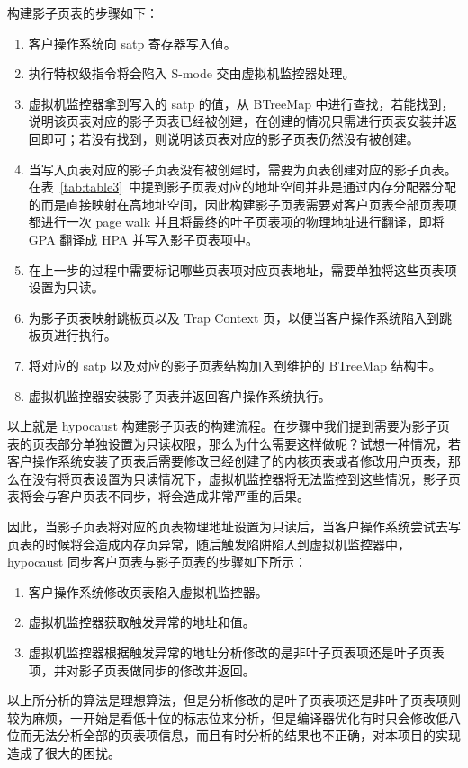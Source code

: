 构建影子页表的步骤如下：
\begin{enumerate}
    \item 客户操作系统向 satp 寄存器写入值。
    \item 执行特权级指令将会陷入 S-mode 交由虚拟机监控器处理。
    \item 虚拟机监控器拿到写入的 satp 的值，从 BTreeMap 中进行查找，若能找到，说明该页表对应的影子页表已经被创建，在创建的情况只需进行页表安装并返回即可；若没有找到，则说明该页表对应的影子页表仍然没有被创建。
    \item 当写入页表对应的影子页表没有被创建时，需要为页表创建对应的影子页表。在表~\ref{tab:table3}~中提到影子页表对应的地址空间并非是通过内存分配器分配的而是直接映射在高地址空间，因此构建影子页表需要对客户页表全部页表项都进行一次 page walk 并且将最终的叶子页表项的物理地址进行翻译，即将 GPA 翻译成 HPA 并写入影子页表项中。
    \item 在上一步的过程中需要标记哪些页表项对应页表地址，需要单独将这些页表项设置为只读。
    \item 为影子页表映射跳板页以及 Trap Context 页，以便当客户操作系统陷入到跳板页进行执行。
    \item 将对应的 satp 以及对应的影子页表结构加入到维护的 BTreeMap 结构中。
    \item 虚拟机监控器安装影子页表并返回客户操作系统执行。
\end{enumerate}


以上就是 hypocaust 构建影子页表的构建流程。在步骤中我们提到需要为影子页表的页表部分单独设置为只读权限，那么为什么需要这样做呢？试想一种情况，若客户操作系统安装了页表后需要修改已经创建了的内核页表或者修改用户页表，那么在没有将页表设置为只读情况下，虚拟机监控器将无法监控到这些情况，影子页表将会与客户页表不同步，将会造成非常严重的后果。

因此，当影子页表将对应的页表物理地址设置为只读后，当客户操作系统尝试去写页表的时候将会造成内存页异常，随后触发陷阱陷入到虚拟机监控器中，hypocaust 同步客户页表与影子页表的步骤如下所示：
\begin{enumerate}
    \item 客户操作系统修改页表陷入虚拟机监控器。
    \item 虚拟机监控器获取触发异常的地址和值。
    \item 虚拟机监控器根据触发异常的地址分析修改的是非叶子页表项还是叶子页表项，并对影子页表做同步的修改并返回。
\end{enumerate}

以上所分析的算法是理想算法，但是分析修改的是叶子页表项还是非叶子页表项则较为麻烦，一开始是看低十位的标志位来分析，但是编译器优化有时只会修改低八位而无法分析全部的页表项信息，而且有时分析的结果也不正确，对本项目的实现造成了很大的困扰。

